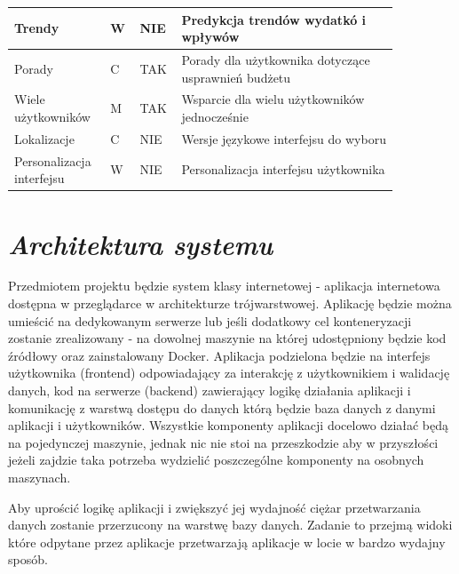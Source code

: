 \documentclass[a4paper,10pt, twoside]{report}
\newcommand{\customstylesection}[1]{\textbf{\textit{#1}}}
\begin{document}
\begin{large}
\begin{table}[H]
\begin{tabular}{|p{0.2\linewidth}|p{0.07\linewidth}|p{0.07\linewidth}|p{0.52\linewidth}|}
    \hline
    {Trendy} & {W} & {NIE} & {Predykcja trendów wydatkó i wpływów}\\
    \hline
    {Porady} & {C} & {TAK} & {Porady dla użytkownika dotyczące usprawnień budżetu}\\
    \hline
    {Wiele użytkowników} & {M} & {TAK} & {Wsparcie dla wielu użytkowników jednocześnie}\\
    \hline
    {Lokalizacje} & {C} & {NIE} & {Wersje językowe interfejsu do wyboru}\\
    \hline
    {Personalizacja interfejsu} & {W} & {NIE} & {Personalizacja interfejsu użytkownika}\\
    \hline
    \end{tabular}
\end{table}

\section{\customstylesection{Architektura systemu}}
{Przedmiotem projektu będzie system klasy internetowej - aplikacja internetowa 
dostępna w przeglądarce w architekturze trójwarstwowej. Aplikację będzie można 
umieścić na dedykowanym serwerze lub jeśli dodatkowy cel konteneryzacji zostanie
 zrealizowany - na dowolnej maszynie na której udostępniony będzie kod źródłowy 
oraz zainstalowany Docker. Aplikacja podzielona będzie na interfejs użytkownika 
(frontend) odpowiadający za interakcję z użytkownikiem i walidację danych, kod 
na serwerze (backend) zawierający logikę działania aplikacji i komunikację z 
warstwą dostępu do danych którą będzie baza danych z danymi aplikacji i 
użytkowników. Wszystkie komponenty aplikacji docelowo działać będą na 
pojedynczej maszynie, jednak nic nie stoi na przeszkodzie aby w przyszłości 
jeżeli zajdzie taka potrzeba wydzielić poszczególne komponenty na osobnych 
maszynach.}

{Aby uprościć logikę aplikacji i zwiększyć jej wydajność ciężar przetwarzania 
danych zostanie przerzucony na warstwę bazy danych. Zadanie to przejmą widoki 
które odpytane przez aplikacje przetwarzają aplikacje w locie w bardzo wydajny 
sposób.}


\end{large}
\end{document}
